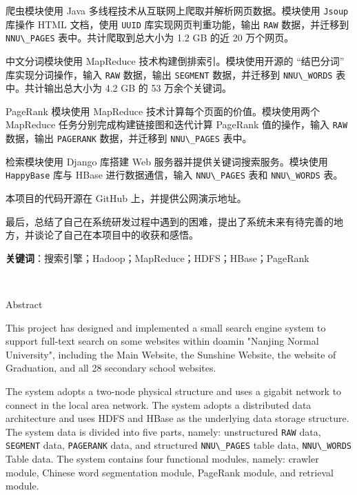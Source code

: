 \documentclass{ctexart}
\newcommand{\code}[1]{\colorbox{backcolor}{\lstinline|#1|}}
\begin{document}
    爬虫模块使用 Java 多线程技术从互联网上爬取并解析网页数据。模块使用 \code{Jsoup} 库操作 HTML 文档，使用 \code{UUID} 库实现网页判重功能，输出 \code{RAW} 数据，并迁移到 \code{NNU\_PAGES} 表中。共计爬取到总大小为 1.2 GB 的近 20 万个网页。

    中文分词模块使用 MapReduce 技术构建倒排索引。模块使用开源的 “结巴分词” 库实现分词操作，输入 \code{RAW} 数据，输出 \code{SEGMENT} 数据，并迁移到 \code{NNU\_WORDS} 表中。共计输出总大小为 4.2 GB 的 53 万余个关键词。

    PageRank 模块使用 MapReduce 技术计算每个页面的价值。模块使用两个 MapReduce 任务分别完成构建链接图和迭代计算 PageRank 值的操作，输入 \code{RAW} 数据，输出 \code{PAGERANK} 数据，并迁移到 \code{NNU\_PAGES} 表中。

    检索模块使用 Django 库搭建 Web 服务器并提供关键词搜索服务。模块使用 \code{HappyBase} 库与 HBase 进行数据通信，输入 \code{NNU\_PAGES} 表和 \code{NNU\_WORDS} 表。

    本项目的代码开源在 GitHub 上，并提供公网演示地址。

    最后，总结了自己在系统研发过程中遇到的困难，提出了系统未来有待完善的地方，并谈论了自己在本项目中的收获和感悟。

    \textbf{关键词}：搜索引擎；Hadoop；MapReduce；HDFS；HBase；PageRank

    \newpage

    \thispagestyle{firstpage}
    \textcolor{white}{.}
    \newpage

    \thispagestyle{abstract-en}

    \begin{center}
        \LARGE Abstract
    \end{center}

    This project has designed and implemented a small search engine system to support full-text search on some websites within doamin "Nanjing Normal University", including the Main Website, the Sunshine Website, the website of Graduation, and all 28 secondary school websites.

    The system adopts a two-node physical structure and uses a gigabit network to connect in the local area network. The system adopts a distributed data architecture and uses HDFS and HBase as the underlying data storage structure. The system data is divided into five parts, namely: unstructured \code{RAW} data, \code{SEGMENT} data, \code{PAGERANK} data, and structured \code{NNU\_PAGES} table data, \code{NNU\_WORDS} Table data. The system contains four functional modules, namely: crawler module, Chinese word segmentation module, PageRank module, and retrieval module.
\end{document}

